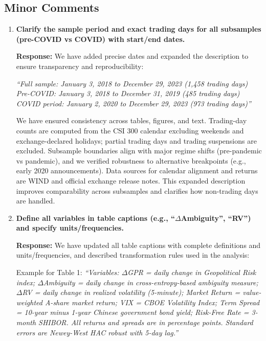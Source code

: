 \documentclass[12pt]{article}
\begin{document}
\subsection*{Minor Comments}

\begin{enumerate}
    \item \textbf{Clarify the sample period and exact trading days for all subsamples (pre-COVID vs COVID) with start/end dates.}

    \begin{responsebox}
    \vspace{0.5cm}
    \textbf{Response:} We have added precise dates and expanded the description to ensure transparency and reproducibility:
    
    \textit{``Full sample: January 3, 2018 to December 29, 2023 (1,458 trading days)
    Pre-COVID: January 3, 2018 to December 31, 2019 (485 trading days)
    COVID period: January 2, 2020 to December 29, 2023 (973 trading days)''}
    
    \vspace{0.5cm}
    We have ensured consistency across tables, figures, and text. Trading-day counts are computed from the CSI 300 calendar excluding weekends and exchange-declared holidays; partial trading days and trading suspensions are excluded. Subsample boundaries align with major regime shifts (pre-pandemic vs pandemic), and we verified robustness to alternative breakpoints (e.g., early 2020 announcements). Data sources for calendar alignment and returns are WIND and official exchange release notes. This expanded description improves comparability across subsamples and clarifies how non-trading days are handled.
    \end{responsebox}

    \item \textbf{Define all variables in table captions (e.g., ``$\Delta$Ambiguity'', ``RV'') and specify units/frequencies.}

    \begin{responsebox}
    \vspace{0.5cm}
    \textbf{Response:} We have updated all table captions with complete definitions and units/frequencies, and described transformation rules used in the analysis:

    \vspace{0.5cm}
    Example for Table 1:
    \textit{``Variables: $\Delta$GPR = daily change in Geopolitical Risk index; $\Delta$Ambiguity = daily change in cross-entropy-based ambiguity measure; $\Delta$RV = daily change in realized volatility (5-minute); Market Return = value-weighted A-share market return; VIX = CBOE Volatility Index; Term Spread = 10-year minus 1-year Chinese government bond yield; Risk-Free Rate = 3-month SHIBOR. All returns and spreads are in percentage points. Standard errors are Newey-West HAC robust with 5-day lag.''}
    

\end{responsebox}
\end{enumerate}
\end{document}
